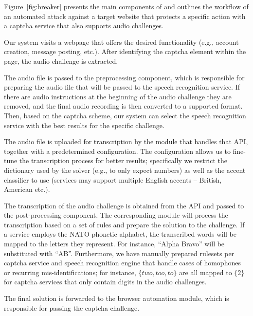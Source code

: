 Figure~\ref{fig:breaker} presents the main components of \system and outlines the workflow of
an automated attack against a target website that protects a specific action with a captcha 
service that also supports audio challenges.

\protect{} Our system visits a webpage that offers the desired functionality 
(e.g., account creation, message posting, etc.). After identifying the captcha element within 
the page, the audio challenge is extracted.

\protect{} The audio file is passed to the preprocessing component, which is responsible 
for preparing the audio file that will be passed to the speech recognition service. If there are audio 
instructions at the beginning of the audio challenge they are removed, and the final audio
recording is then converted to a supported format. Then, based on the captcha scheme, our system
can select the speech recognition service with the best results for the specific challenge.

\protect{} The audio file is uploaded for transcription by the module that handles that API, 
together with a predetermined configuration. The configuration allows us to fine-tune the transcription process
for better results; specifically we restrict the dictionary used by the solver (e.g., to only expect  
numbers) as well as the accent classifier to use (services may support multiple English accents 
-- British, American etc.).

\protect{} The transcription of the audio challenge is obtained from the API
and passed to the post-processing component. The corresponding module will process the transcription 
based on a set of rules %
and prepare the solution to the challenge. If a service employs the 
NATO phonetic alphabet, the transcribed words will be mapped to the letters they represent. For instance, 
``Alpha Bravo'' will be substituted with ``AB''. Furthermore, we have manually prepared rulesets
per captcha service and speech recognition engine %
that handle cases of homophones or recurring mis-identifications; for instance, $\{two,too,to\}$ are all
mapped to $\{2\}$ for captcha services that only contain digits in the audio challenges.

\protect{} The final solution is forwarded to the browser automation module,
which is responsible for passing the captcha challenge.

